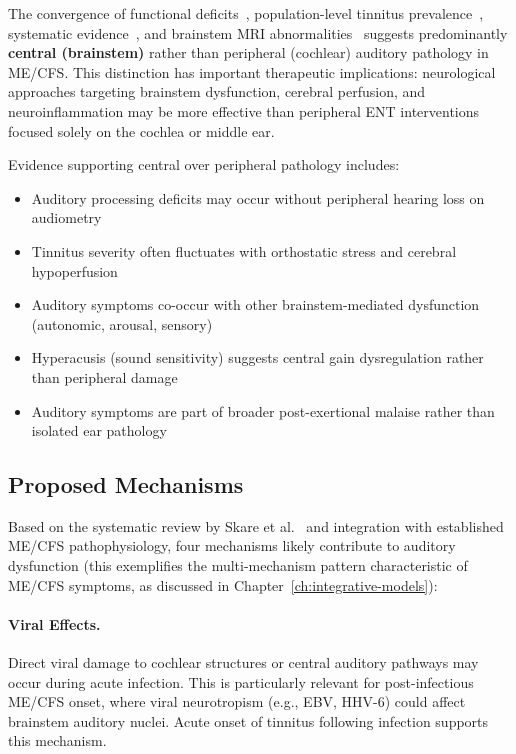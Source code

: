 \begin{observation}
\label{obs:central-auditory}
The convergence of functional deficits~\cite{Johnson1996}, population-level tinnitus prevalence~\cite{Schubert2021}, systematic evidence~\cite{Skare2024}, and brainstem MRI abnormalities~\cite{Nelson2021} suggests predominantly \textbf{central (brainstem)} rather than peripheral (cochlear) auditory pathology in ME/CFS. This distinction has important therapeutic implications: neurological approaches targeting brainstem dysfunction, cerebral perfusion, and neuroinflammation may be more effective than peripheral ENT interventions focused solely on the cochlea or middle ear.
\end{observation}

Evidence supporting central over peripheral pathology includes:

\begin{itemize}
    \item Auditory processing deficits may occur without peripheral hearing loss on audiometry
    \item Tinnitus severity often fluctuates with orthostatic stress and cerebral hypoperfusion
    \item Auditory symptoms co-occur with other brainstem-mediated dysfunction (autonomic, arousal, sensory)
    \item Hyperacusis (sound sensitivity) suggests central gain dysregulation rather than peripheral damage
    \item Auditory symptoms are part of broader post-exertional malaise rather than isolated ear pathology
\end{itemize}

\subsection{Proposed Mechanisms}

Based on the systematic review by Skare et al.~\cite{Skare2024} and integration with established ME/CFS pathophysiology, four mechanisms likely contribute to auditory dysfunction (this exemplifies the multi-mechanism pattern characteristic of ME/CFS symptoms, as discussed in Chapter~\ref{ch:integrative-models}):

\paragraph{Viral Effects.}
Direct viral damage to cochlear structures or central auditory pathways may occur during acute infection. This is particularly relevant for post-infectious ME/CFS onset, where viral neurotropism (e.g., EBV, HHV-6) could affect brainstem auditory nuclei. Acute onset of tinnitus following infection supports this mechanism.

